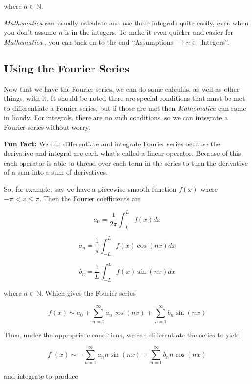 \documentclass[11pt,letterpaper,twoside,titlepage]{book}
\newcommand{\Mathematica}{\textit{Mathematica} }
\begin{document}
					where $n \in \mathbb{N} $.  
					
					\Mathematica can usually calculate and use these integrals quite easily, even when you don't assume $n$ is in the integers.  To make it even quicker and easier for \Mathematica, you can tack on to the end ``Assumptions $\rightarrow n \in $ Integers''.
					
				\subsection{Using the Fourier Series}
				
					Now that we have the Fourier series, we can do some calculus, as well as other things, with it.  It should be noted there are special conditions that must be met to differentiate a Fourier series, but if those are met then \Mathematica can come in handy.  For integrals, there are no such conditions, so we can integrate a Fourier series without worry.  
					
					\textbf{Fun Fact:} We can differentiate and integrate Fourier series because the derivative and integral are each what's called a linear operator.  Because of this each operator is able to thread over each term in the series to turn the derivative of a sum into a sum of derivatives.  
					
					So, for example, say we have a piecewise smooth function $f(x)$ where $ -\pi < x \leq \pi $.  Then the Fourier coefficients are 
					
					\[ a_0 = \frac{1}{2\pi} \int_{-L}^L f(x) dx \]
					
					\[ a_n = \frac{1}{\pi} \int_{-L}^L f(x) \cos \left( n x \right) dx \]
					
					\[ b_n = \frac{1}{L} \int_{-L}^L f(x) \sin \left( n x \right) dx \]
					
					where $n \in \mathbb{N} $. Which gives the Fourier series
					
					\[ f(x) \sim a_0 + \sum_{n=1}^\infty a_n \cos (n x) + \sum_{n=1}^\infty b_n \sin (n x) \]
					
					Then, under the appropriate conditions, we can differentiate the series to yield
					
					\[ f^\prime(x) \sim -\sum_{n=1}^\infty a_n n \sin (n x) + \sum_{n=1}^\infty b_n n \cos (n x) \]
					
					and integrate to produce
					
\end{document}
